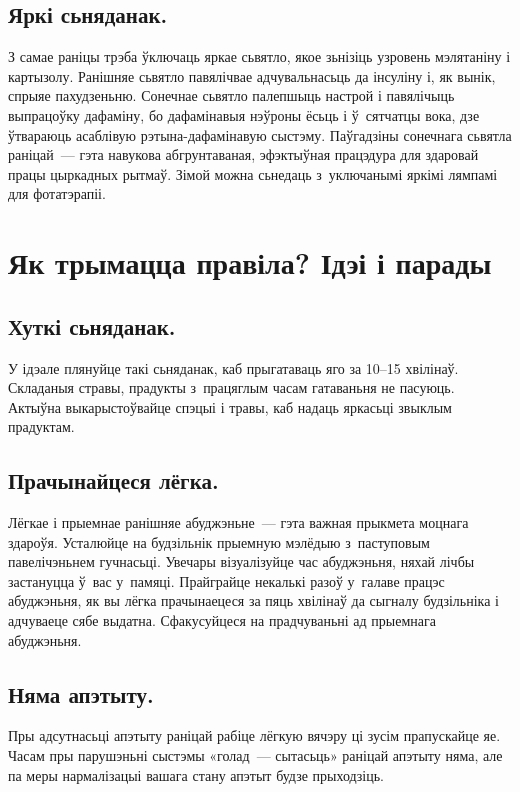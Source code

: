 
\subsection{Яркі сьняданак.}
З самае раніцы трэба ўключаць яркае сьвятло, якое зьнізіць узровень мэлятаніну і картызолу. Ранішняе сьвятло павялічвае адчувальнасьць да інсуліну і, як вынік, спрыяе пахудзеньню. Сонечнае сьвятло палепшыць настрой і павялічыць выпрацоўку дафаміну, бо дафамінавыя нэўроны ёсьць і ў~сятчатцы вока, дзе ўтвараюць асаблівую рэтына-дафамінавую сыстэму. Паўгадзіны сонечнага сьвятла раніцай~--- гэта навукова абгрунтаваная, эфэктыўная працэдура для здаровай працы цыркадных рытмаў. Зімой можна сьнедаць з~уключанымі яркімі лямпамі для фотатэрапіі.

\section{Як трымацца правіла? Ідэі і парады}

\subsection{Хуткі сьняданак.}
У ідэале плянуйце такі сьняданак, каб прыгатаваць яго за 10--15 хвілінаў. Складаныя стравы, прадукты з~працяглым часам гатаваньня не пасуюць. Актыўна выкарыстоўвайце спэцыі і травы, каб надаць яркасьці звыклым прадуктам.

\subsection{Прачынайцеся лёгка.}
Лёгкае і прыемнае ранішняе абуджэньне~--- гэта важная прыкмета моцнага здароўя. Усталюйце на будзільнік прыемную мэлёдыю з~паступовым павелічэньнем гучнасьці. Увечары візуалізуйце час абуджэньня, няхай лічбы застануцца ў~вас у~памяці. Прайграйце некалькі разоў у~галаве працэс абуджэньня, як вы лёгка прачынаецеся за пяць хвілінаў да сыгналу будзільніка і адчуваеце сябе выдатна. Сфакусуйцеся на прадчуваньні ад прыемнага абуджэньня.

\subsection{Няма апэтыту.}
Пры адсутнасьці апэтыту раніцай рабіце лёгкую вячэру ці зусім прапускайце яе. Часам пры парушэньні сыстэмы «голад~--- сытасьць» раніцай апэтыту няма, але па меры нармалізацыі вашага стану апэтыт будзе прыходзіць.

